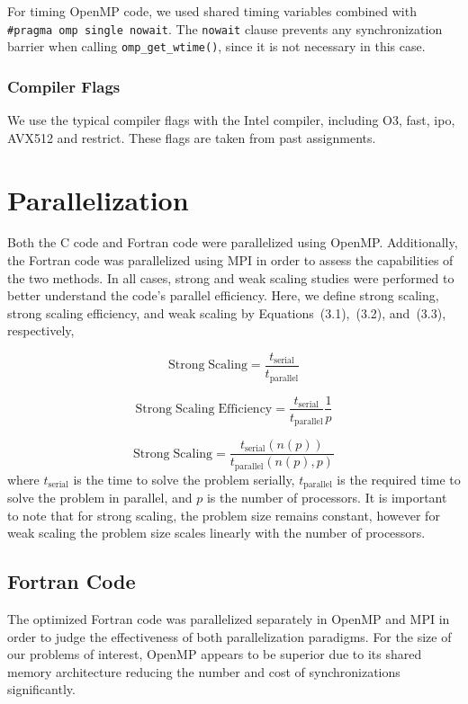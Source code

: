 \documentclass{scrartcl}
\begin{document}
For timing OpenMP code, we used shared timing variables combined with \texttt{\#pragma omp single nowait}. The \texttt{nowait} clause prevents any synchronization barrier when calling \texttt{omp\_get\_wtime()}, since it is not necessary in this case.
          
          \subsubsection{Compiler Flags}
          We use the typical compiler flags with the Intel compiler, including O3, fast, ipo, AVX512 and restrict. These flags are taken from past assignments.
       

  
  \section{Parallelization}
  Both the C code and Fortran code were parallelized using OpenMP. Additionally, the Fortran code was parallelized using MPI in order to assess the capabilities of the two methods. In all cases, strong and weak scaling studies were performed to better understand the code's parallel efficiency. Here, we define strong scaling, strong scaling efficiency, and weak scaling by Equations~(3.1),~(3.2), and~(3.3), respectively,
  
  \begin{equation}
  \mathrm{Strong\;Scaling} = \frac{t_{\mathrm{serial}}}{t_{\mathrm{parallel}}}
  \label{eq:ss}
  \end{equation}
  
   \begin{equation}
  \mathrm{Strong\;Scaling\;Efficiency} = \frac{t_{\mathrm{serial}}}{t_{\mathrm{parallel}}} \frac{1}{p}    
   \label{eq:sse}
   \end{equation}
    
    \begin{equation}
      \mathrm{Strong\;Scaling} = \frac{t_{\mathrm{serial}}(n(p))}{t_{\mathrm{parallel}}(n(p),p)}  
    \label{eq:ws}
    \end{equation}
	 where $t_{\mathrm{serial}}$ is the time to solve the problem serially, $t_{\mathrm{parallel}}$ is the required time to solve the problem in parallel, and $p$ is the number of processors. It is important to note that for strong scaling, the problem size remains constant, however for weak scaling the problem size scales linearly with the number of processors.
  
  \subsection{Fortran Code}    
  The optimized Fortran code was parallelized separately in OpenMP and MPI in order to judge the effectiveness of both parallelization paradigms. For the size of our problems of interest, OpenMP appears to be superior due to its shared memory architecture reducing the number and cost of synchronizations significantly.
\end{document}
